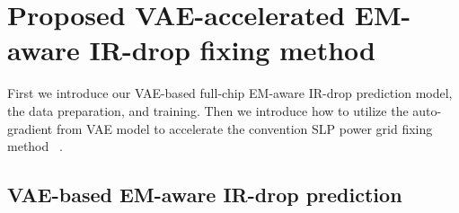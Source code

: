 \section{Proposed VAE-accelerated EM-aware IR-drop fixing method}
\label{sec:strategy}


First we introduce our VAE-based full-chip EM-aware IR-drop prediction model, the data preparation, and training.
Then we introduce how to utilize the auto-gradient from VAE model to accelerate the convention SLP power grid fixing method ~\cite{Sukharev:2019pg}.


\subsection{VAE-based EM-aware IR-drop prediction}
\label{subsec:vae}




